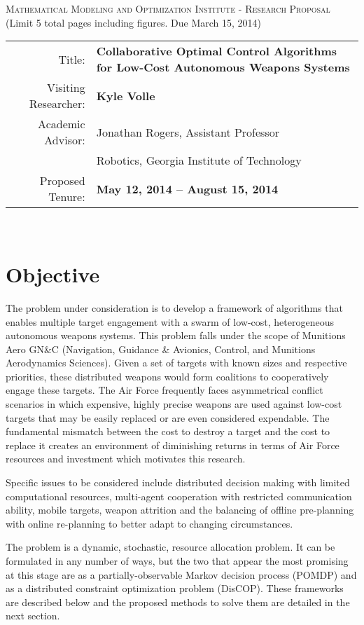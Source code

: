 \documentclass{article}
\begin{document}
\begin{center}
\textsc{Mathematical Modeling and Optimization Institute - Research Proposal}\\ \textnormal{(Limit 5 total pages including figures.  Due March 15, 2014)}
\bigskip\\
\end{center}


\begin{tabular}{rl}
Title: & \textbf{Collaborative Optimal Control Algorithms for Low-Cost Autonomous Weapons Systems}\\
Visiting Researcher: & \textbf{Kyle Volle}\\
Academic Advisor: & Jonathan Rogers, Assistant Professor\\
                  & Robotics, Georgia Institute of Technology\\
Proposed Tenure:& \textbf{May 12, 2014 -- August 15, 2014}\\
\end{tabular}
\bigskip\\

	
\section{Objective}
The problem under consideration is to develop a framework of algorithms that enables multiple target engagement with a swarm of low-cost, heterogeneous autonomous weapons systems. This problem falls under the scope of Munitions Aero GN\&C (Navigation, Guidance \& Avionics, Control, and Munitions Aerodynamics Sciences). Given a set of targets with known sizes and respective priorities, these distributed weapons would form coalitions to cooperatively engage these targets. The Air Force frequently faces asymmetrical conflict scenarios in which expensive, highly precise weapons are used against low-cost targets that may be easily replaced or are even considered expendable. The fundamental mismatch between the cost to destroy a target and the cost to replace it creates an environment of diminishing returns in terms of Air Force resources and investment which motivates this research.

Specific issues to be considered include distributed decision making with limited computational resources, multi-agent cooperation with restricted communication ability, mobile targets, weapon attrition and the balancing of offline pre-planning with online re-planning to better adapt to changing circumstances.

The problem is a dynamic, stochastic, resource allocation problem. It can be formulated in any number of ways, but the two that appear the most promising at this stage are as a partially-observable Markov decision process (POMDP) and as a distributed constraint optimization problem (DisCOP). These frameworks are described below and the proposed methods to solve them are detailed in the next section.
\end{document}

